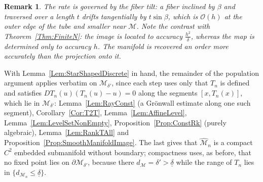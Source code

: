 \documentclass[11pt]{amsart}%
\theoremstyle{plain}
\newtheorem{remark}[definition]{Remark}
\newcommand{\1}{\mathbf{1}}
\newcommand{\M}{\mathcal{M}}
\begin{document}
\begin{remark}
    The rate is governed by the fiber tilt: a fiber inclined by $\beta$ and traversed over a length
    $t$ drifts tangentially by $t\sin\beta$, which is $\mathcal{O}(h)$ at the outer edge of the tube and
    smaller near $\M$. Note the contrast with Theorem~\ref{Thm:FiniteN}: the \emph{image} is located
    to accuracy $\frac{h^2}{\delta}$, whereas the \emph{map} is determined only to accuracy $h$. The
    manifold is recovered an order more accurately than the projection onto it.
\end{remark}

\noindent With Lemma~\ref{Lem:StarShapedDiscrete} in hand, the remainder of the population
argument applies verbatim on $\M_{\delta'}$, since each step uses only that $T_n$ is defined and
satisfies $DT_n(u)(T_n(u)-u)=0$ along the segments $[x,T_n(x)]$, which lie in $\M_{\delta'}$:
Lemma~\ref{Lem:RayConst} (a Gr\"onwall estimate along one such segment), Corollary~\ref{Cor:T2T},
Lemma~\ref{Lem:AffineLevel}, Lemma~\ref{Lem:LevelSetNonEmpty}, Proposition~\ref{Prop:ConstRk}
(purely algebraic), Lemma~\ref{Lem:RankTAll} and
Proposition~\ref{Prop:SmoothManifoldImage}. The last gives that $\widehat{\M}_n$ is a compact
$C^2$ embedded submanifold without boundary; compactness uses, as before, that no fixed point lies
on $\partial \M_{\delta'}$, because there $d_\M=\delta'>\underline\delta$ while the range of $T_n$
lies in $\{d_{\M_n}\le\underline\delta\}$.
\end{document}
